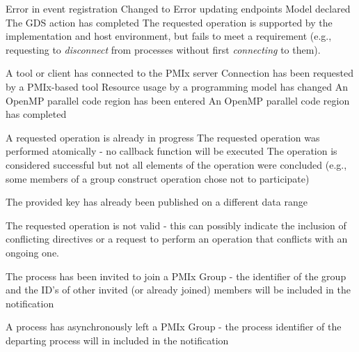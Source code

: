 \begin{constantdesc}
%
Error in event registration
%
Changed to 
%
Error updating endpoints
%
Model declared
%
The \ac{GDS} action has completed
%
The requested operation is supported by the implementation and host environment, but fails to meet a requirement (e.g., requesting to \textit{disconnect} from processes without first \textit{connecting} to them).

A tool or client has connected to the \ac{PMIx} server
%
Connection has been requested by a PMIx-based tool
%
Resource usage by a programming model has changed
%
An OpenMP parallel code region has been entered
%
An OpenMP parallel code region has completed

%
A requested operation is already in progress
%
The requested operation was performed atomically - no callback function will be executed
%
The operation is considered successful but not all elements of the operation were concluded (e.g., some members of a group construct operation chose not to participate)

%
The provided key has already been published on a different data range

%
The requested operation is not valid - this can possibly indicate the inclusion of conflicting directives or a request to perform an operation that conflicts with an ongoing one.

%
The process has been invited to join a \ac{PMIx} Group - the identifier of the group and the ID's of other invited (or already joined) members will be included in the notification

%
A process has asynchronously left a \ac{PMIx} Group - the process identifier of the departing process will in included in the notification


\end{constantdesc}
